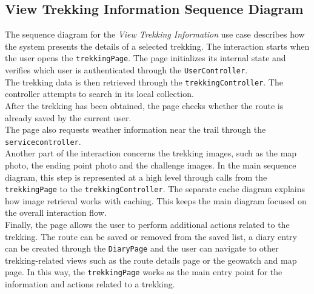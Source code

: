 \subsection{View Trekking Information Sequence Diagram}
The sequence diagram for the \textit{View Trekking Information} use case describes how the system presents the details of a selected trekking. The interaction starts when the user opens the \texttt{trekkingPage}. The page initializes its internal state and verifies which user is authenticated through the \texttt{UserController}. \\
The trekking data is then retrieved through the \texttt{trekkingController}. The controller attempts to search in its local collection. \\
After the trekking has been obtained, the page checks whether the route is already saved by the current user. \\
The page also requests weather information near the trail through the \texttt{servicecontroller}.  \\
Another part of the interaction concerns the trekking images, such as the map photo, the ending point photo and the challenge images. In the main sequence diagram, this step is represented at a high level through calls from the \texttt{trekkingPage} to the \texttt{trekkingController}. The separate cache diagram explains how image retrieval works with caching. This keeps the main diagram focused on the overall interaction flow. \\
Finally, the page allows the user to perform additional actions related to the trekking. The route can be saved or removed from the saved list, a diary entry can be created through the \texttt{DiaryPage} and the user can navigate to other trekking-related views such as the route details page or the geowatch and map page. In this way, the \texttt{trekkingPage} works as the main entry point for the information and actions related to a trekking.  \\


